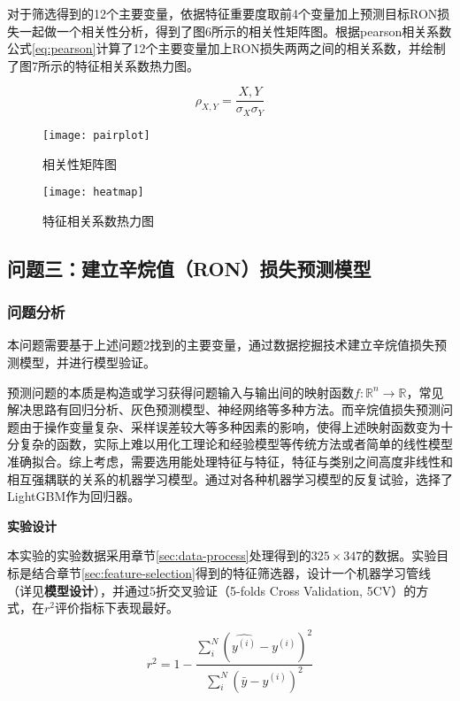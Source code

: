 \documentclass[bwprint]{gmcmthesis}
\begin{document}
对于筛选得到的12个主要变量，依据特征重要度取前4个变量加上预测目标RON损失一起做一个相关性分析，得到了图6所示的相关性矩阵图。根据pearson相关系数公式\eqref{eq:pearson}计算了12个主要变量加上RON损失两两之间的相关系数，并绘制了图7所示的特征相关系数热力图。

\begin{equation}\label{eq:pearson}
	\rho_{X,Y}=\frac{X,Y}{\sigma_X\sigma_Y}
\end{equation}


\begin{figure}[htb]
	\centering
	\texttt{[image: pairplot]}
	\caption{相关性矩阵图}
\end{figure}

\begin{figure}[htb]
	\centering
	\texttt{[image: heatmap]}
	\caption{特征相关系数热力图}
\end{figure}



\FloatBarrier
\subsection{问题三：建立辛烷值（RON）损失预测模型}\label{sec:modeling}

\FloatBarrier
\subsubsection{问题分析}

本问题需要基于上述问题2找到的主要变量，通过数据挖掘技术建立辛烷值损失预测模型，并进行模型验证。

预测问题的本质是构造或学习获得问题输入与输出间的映射函数$f: \mathbb{R}^n \rightarrow \mathbb{R}$，常见解决思路有回归分析、灰色预测模型、神经网络等多种方法。而辛烷值损失预测问题由于操作变量复杂、采样误差较大等多种因素的影响，使得上述映射函数变为十分复杂的函数，实际上难以用化工理论和经验模型等传统方法或者简单的线性模型准确拟合。综上考虑，需要选用能处理特征与特征，特征与类别之间高度非线性和相互强耦联的关系的机器学习模型。通过对各种机器学习模型的反复试验，选择了LightGBM作为回归器。

\textbf{实验设计}

本实验的实验数据采用章节\ref{sec:data-process}处理得到的$325 \times 347$的数据。实验目标是结合章节\ref{sec:feature-selection}得到的特征筛选器，设计一个机器学习管线（详见\textbf{模型设计}），并通过5折交叉验证（5-folds Cross Validation, 5CV）的方式，在$r^2$评价指标下表现最好。

\begin{equation}\label{eq:r2}
	r^2=1-\frac{\sum_i^N(\hat{y^{(i)}}-y^{(i)})^2}{\sum_i^N(\bar{y}-y^{(i)})^2}
\end{equation}
\end{document}
